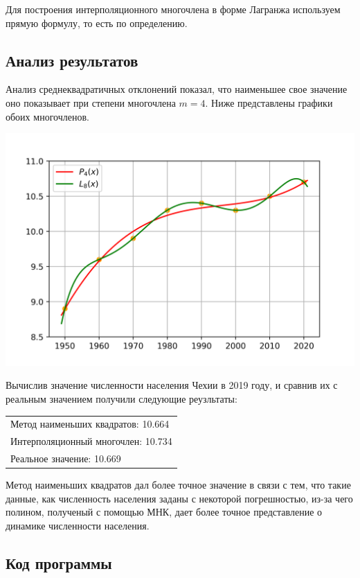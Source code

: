 Для построения интерполяционного многочлена в форме Лагранжа используем прямую формулу, то есть по определению.

\subsection*{Анализ результатов}

Анализ среднеквадратичных отклонений показал, что наименьшее свое значение оно показывает при степени многочлена $m = 4$. Ниже представлены графики обоих многочленов.

\noindent
\includegraphics{plot_4.1.png}

Вычислив значение численности населения Чехии в 2019 году, и сравнив их с реальным значением получили следующие реузльтаты:

\begin{tabular}{l}
	Метод наименьших квадратов: 10.664 \\
	Интерполяционный многочлен: 10.734 \\
	Реальное значение: 10.669 \\
\end{tabular}

Метод наименьших квадратов дал более точное значение в связи с тем, что такие данные, как численность населения заданы с некоторой погрешностью, из-за чего полином, полученый с помощью МНК, дает более точное представление о динамике численности населения.
\newpage
\subsection*{Код программы}

